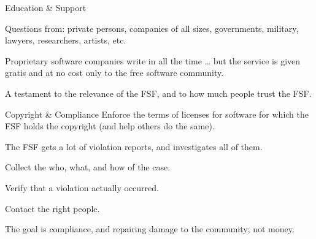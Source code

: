 \documentclass[
  size=12pt,
  style=simple,
  paper=screen
]{powerdot}
\begin{document}
\begin{wideslide}{Education \& Support}
  \begin{itemize}
    \setlength{\itemsep}{1em}

    \nitem Questions from: private persons, companies of all sizes,
    governments, military, lawyers, researchers, artists, etc.

    \pp

    \nitem Proprietary software companies write in all the time \ldots
    \pp but the service is given gratis and at no cost only to the
    free software community.

    \pp

    \nitem A testament to the relevance of the FSF, and to how much
    people trust the FSF.
  \end{itemize}

\end{wideslide}

\begin{wideslide}{Copyright \& Compliance}
  Enforce the terms of licenses for software for which the FSF holds
  the copyright (and help others do the same).

  \pp

  \begin{itemize}
    \setlength{\itemsep}{1em}

    \nitem The FSF gets a lot of violation reports, and investigates
    all of them.

    \pp

    \nitem Collect the who, what, and how of the case.

    \pp

    \nitem Verify that a violation actually occurred.

    \pp

    \nitem Contact the right people.

    \pp

    \nitem The goal is compliance, and repairing damage to the
    community; not money.

  \end{itemize}
\end{wideslide}
\end{document}
